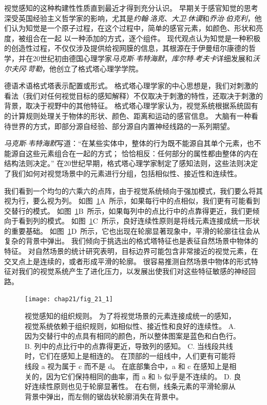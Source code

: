 视觉感知的这种构建性性质直到最近才得到充分认识。
早期关于感官知觉的思考深受英国经验主义哲学家的影响，尤其是\textit{约翰$\cdot$洛克}、\textit{大卫$\cdot$休谟}和\textit{乔治$\cdot$伯克利}，他们认为知觉是一个原子过程，在这个过程中，简单的感官元素，如颜色、形状和亮度，被组合在一起 以一种添加的方式，逐个组件。
现代观点认为知觉是一种积极的创造性过程，不仅仅涉及提供给视网膜的信息，其根源在于伊曼纽尔康德的哲学，并在20世纪初由德国心理学家\textit{马克斯$\cdot$韦特海默}，\textit{库尔特$\cdot$考夫卡}详细发展和\textit{沃尔夫冈$\cdot$苛勒}，他创立了格式塔心理学学院。


德语术语格式塔表示配置或形式。
格式塔心理学家的中心思想是，我们对刺激的看法（我们对任何视觉目标的感知解释）不仅取决于刺激的特性，还取决于刺激的背景，取决于视野中的其他特征。
格式塔心理学家认为，视觉系统根据系统固有的计算规则处理关于物体的形状、颜色、距离和运动的感官信息。
大脑有一种看待世界的方式，即部分源自经验、部分源自内置神经线路的一系列期望。


\textit{马克斯$\cdot$韦特海默}写道：“在某些实体中，整体的行为既不能源自其单个元素，也不能源自这些元素组合在一起的方式；
恰恰相反：任何部分的属性都由整体的内在结构法则决定。” 
在20世纪早期，格式塔心理学家制定了感知法则，这些法则决定了我们如何对视觉场景中的元素进行分组，包括相似性、接近性和连续性。


我们看到一个均匀的六乘六的点阵，由于视觉系统倾向于强加模式，我们要么将其视为行，要么视为列。
如图~\ref{fig:21_1}A~所示，如果每行中的点相似，我们更有可能看到交替行的模式。
如图~\ref{fig:21_1}B~所示，如果每列中的点比行中的点靠得更近，我们更倾向于看到列的模式。
如图~\ref{fig:21_1}C~所示，良好连续性原则是将线元素连接成统一形状的重要基础。
如图~\ref{fig:21_1}D~所示，它也出现在轮廓显著现象中，平滑的轮廓往往会从复杂的背景中弹出。
我们倾向于挑选出的格式塔特征也是表征自然场景中物体的特征。
对自然场景的统计研究表明，目标边界可能包含非常接近的视觉元素，在交叉点上是连续的，或者形成平滑的轮廓。
很容易推测自然场景中物体的形式特征对我们的视觉系统产生了进化压力，以发展出使我们对这些特征敏感的神经回路。


\begin{figure}[htbp]
	\centering
	\texttt{[image: chap21/fig\_21\_1]}
	\caption{视觉感知的组织规则。
		为了将视觉场景的元素连接成统一的感知，视觉系统依赖于组织规则，如相似性、接近性和良好的连续性。
		A. 因为交替行中的点具有相同的颜色，所以整体图案是蓝色和白色行。
		B. 列中的点比行中的点靠得更近，导致列的感知。
		C. 当线段共线时，它们在感知上是相连的。
		在顶部的一组线中，人们更有可能将线段 a 视为属于 c 而不是 d。
		在底部集合中，a 和 c 在感知上是相关的，因为它们保持相同的曲率，而 a 和 b 似乎是不连续的。
		D. 良好连续性原则也见于轮廓显著性。
		在右侧，线条元素的平滑轮廓从背景中弹出，而左侧的锯齿状轮廓消失在背景中\cite{field1993contour}。}
	\label{fig:21_1}
\end{figure}


